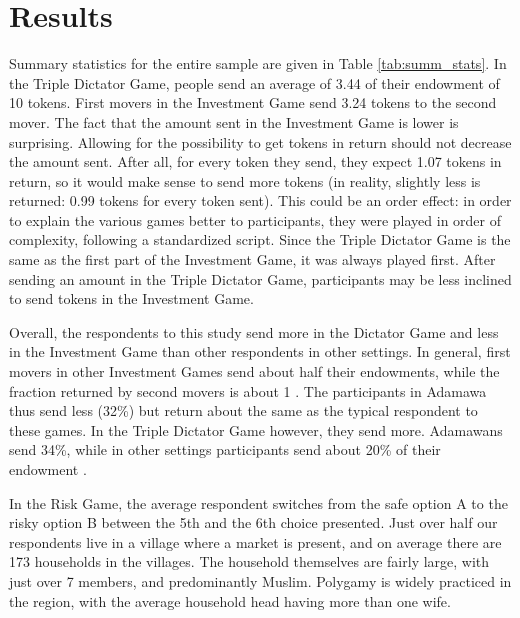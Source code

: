 

\section{Results}

Summary statistics for the entire sample are given in Table \ref{tab:summ_stats}. In the Triple Dictator Game, people send an average of 3.44 of their endowment of 10 tokens. First movers in the Investment Game send 3.24 tokens to the second mover. The fact that the amount sent in the Investment Game is lower is surprising. Allowing for the possibility to get tokens in return should not decrease the amount sent. After all, for every token they send, they expect 1.07 tokens in return, so it would make sense to send more tokens (in reality, slightly less is returned: 0.99 tokens for every token sent). This could be an order effect: in order to explain the various games better to participants, they were played in order of complexity, following a standardized script. Since the Triple Dictator Game is the same as the first part of the Investment Game, it was always played first. After sending an amount in the Triple Dictator Game, participants may be less inclined to send tokens in the Investment Game. 
 
Overall, the respondents to this study send more in the Dictator Game and less in the Investment Game than other respondents in other settings. In general, first movers in other Investment Games send about half their endowments, while the fraction returned by second movers is about 1 \cite[see e.g.][]{Camerer2003,Bohnet2007}. The participants in Adamawa thus send less (32\%) but return about the same as the typical respondent to these games. In the Triple Dictator Game however, they send more.  Adamawans send 34\%, while in other settings participants send about 20\% of their endowment \citep{Bohnet2007,Ashraf2006}.

In the Risk Game, the average respondent switches from the safe option A to the risky option B between the 5th and the 6th choice presented. Just over half our respondents live in a village where a market is present, and on average there are 173 households in the villages. The household themselves are fairly large, with just over 7 members, and predominantly Muslim. Polygamy is widely practiced in the region, with the average household head having more than one wife. 


